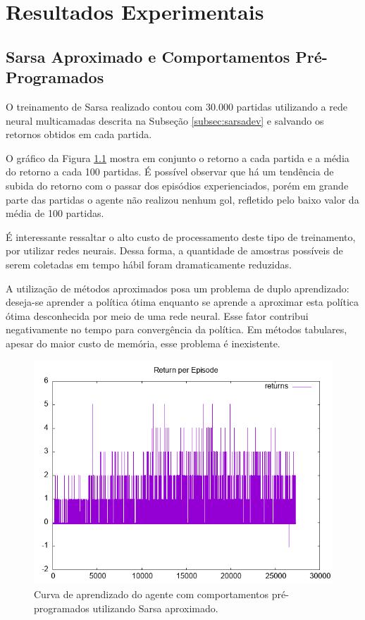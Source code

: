 \chapter{Resultados Experimentais}
\label{chap:Resultados}





\section{Sarsa Aproximado e Comportamentos Pré-Programados}

O treinamento de Sarsa realizado contou com 30.000 partidas utilizando a rede neural multicamadas descrita na Subseção \ref{subsec:sarsadev} e salvando os retornos obtidos em cada partida.

O gráfico da Figura \ref{fig:single-agent-sarsa-behaviors} mostra em conjunto o retorno a cada partida e a média do retorno a cada 100 partidas. É possível observar que há um tendência de subida do retorno com o passar dos episódios experienciados, porém em grande parte das partidas o agente não realizou nenhum gol, refletido pelo baixo valor da média de 100 partidas.

É interessante ressaltar o alto custo de processamento deste tipo de treinamento, por utilizar redes neurais. Dessa forma, a quantidade de amostras possíveis de serem coletadas em tempo hábil foram dramaticamente reduzidas.

A utilização de métodos aproximados posa um problema de duplo aprendizado: deseja-se aprender a política ótima enquanto se aprende a aproximar esta política ótima desconhecida por meio de uma rede neural. Esse fator contribui negativamente no tempo para convergência da política. Em métodos tabulares, apesar do maior custo de memória, esse problema é inexistente.

\begin{figure}[H]
	\includegraphics[width=0.9\linewidth]{figs/sarsa-tmp.png}
	\centering
	\caption{Curva de aprendizado do agente com comportamentos pré-programados utilizando Sarsa aproximado.}
	\label{fig:single-agent-sarsa-behaviors}
\end{figure}

